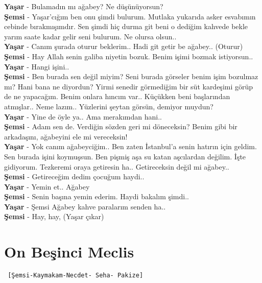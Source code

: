 \documentclass[]{book}
\begin{document}
\textbf{Yaşar} - Bulamadın mı ağabey? Ne düşünüyorsun?\\
\textbf{Şemsi} - Yaşar'cığım ben onu şimdi bulurum. Mutlaka yukarıda asker esvabımın cebinde bırakmışımdır. Sen şimdi hiç durma git beni o dediğim kahvede bekle yarım saate kadar gelir seni bulurum. Ne olursa olsun..\\
\textbf{Yaşar} - Canım şurada oturur beklerim.. Hadi git getir be ağabey.. (Oturur)\\
\textbf{Şemsi} - Hay Allah senin galiba niyetin bozuk. Benim işimi bozmak istiyorsun..\\
\textbf{Yaşar} - Hangi işini..\\
\textbf{Şemsi} - Ben burada sen değil miyim? Seni burada görseler benim işim bozulmaz mı? Hani bana ne diyordun? Yirmi senedir görmediğim bir süt kardeşimi görüp de ne yapacağım. Benim onlara hıncım var.. Küçükken beni başlarından atmışlar.. Neme lazım.. Yüzlerini şeytan görsün, demiyor muydun?\\
\textbf{Yaşar} - Yine de öyle ya.. Ama merakımdan hani..\\
\textbf{Şemsi} - Adam sen de. Verdiğin sözden geri mi döneceksin? Benim gibi bir arkadaşını, ağabeyini ele mi vereceksin!\\
\textbf{Yaşar} - Yok canım ağabeyciğim.. Ben zaten İstanbul'a senin hatırın için geldim. Sen burada işini koymuşsun. Ben pişmiş aşa su katan aşcılardan değilim. İşte gidiyorum. Tezkeremi oraya getiresin ha.. Getireceksin değil mi ağabey..\\
\textbf{Şemsi} - Getireceğim dedim çocuğum haydi..\\
\textbf{Yaşar} - Yemin et.. Ağabey\\
\textbf{Şemsi} - Senin başına yemin ederim. Haydi bakalım şimdi..\\
\textbf{Yaşar} - Şemsi Ağabey kahve paralarım senden ha..\\
\textbf{Şemsi} - Hay, hay, (Yaşar çıkar)\\

\hypertarget{on-besinci-meclis-1}{%
\section{On Beşinci Meclis}\label{on-besinci-meclis-1}}

\begin{verbatim}
 [Şemsi-Kaymakam-Necdet- Seha- Pakize]
\end{verbatim}
\end{document}
